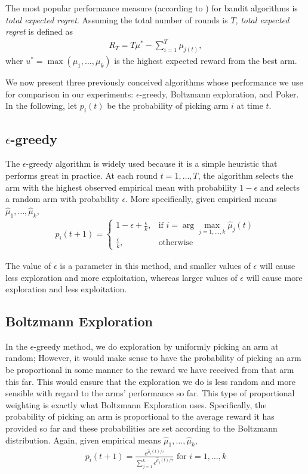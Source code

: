 \documentclass[12pt]{article}
\begin{document}
The most popular performance measure (according to \cite{Kuleshov}) for bandit algorithms is \emph{total expected regret}.  Assuming the 
total number of rounds is $T$, \emph{total expected regret} is defined as
\begin{align}
R_T = T\mu^{*} - \sum_{i=1}^{T} \mu_{j(t)},
\end{align}
wher $u^{*} = \max(\mu_1, \ldots, \mu_k)$ is the highest expected reward from the best arm. 

We now present three previously conceived algorithms whose performance we use for comparison in our experiments:  $\epsilon$-greedy, Boltzmann exploration, and Poker.
In the following, let $p_i(t)$ be the probability of picking arm $i$ at time $t$.

\subsection{$\epsilon$-greedy}
The $\epsilon$-greedy algorithm is widely used because it is a simple heuristic that performs great in practice. 
At each round $t = 1, \ldots, T$, the algorithm selects the arm with the highest observed empirical mean with probability $1 - \epsilon$ and
selects a random arm with probability $\epsilon$.  More specifically, given empirical means $\hat{\mu}_1, \ldots, \hat{\mu}_k$,
\begin{align*}
p_i(t+1) = 
\begin{cases}
1 - \epsilon + \frac{\epsilon}{k}, & \textrm{if } i = \arg \max_{j = 1, \ldots, k} \hat{\mu}_j(t) \\
\frac{\epsilon}{k}, & \textrm{otherwise}
\end{cases}
\end{align*}

The value of $\epsilon$ is a parameter in this method, and smaller values of $\epsilon$ will cause less exploration and more exploitation, whereas
larger values of $\epsilon$ will cause more exploration and less exploitation.

\subsection{Boltzmann Exploration}
In the $\epsilon$-greedy method, we do exploration by uniformly picking an arm at random; However, it would make sense to have the probability 
of picking an arm be proportional in some manner to the reward we have received from that arm this far.  This would ensure that the exploration we do 
is less random and more sensible with regard to the arms' performance so far.  This type of proportional weighting is exactly what Boltzmann Exploration 
uses.  Specifically, the probability of picking an arm is proportional to the average reward it has provided so far and these probabilities are 
set according to the Boltzmann distribution.  Again, given empirical means $\hat{\mu}_1, \ldots, \hat{\mu}_k$,
\begin{align*}
p_i(t+1) = \frac{e^{\hat{\mu}_i(t)/\tau}}{\sum_{j=1}^{k} e^{\hat{\mu}_j(t)/\tau}} \, \, \textrm{for } i = 1, \ldots, k
\end{align*}
\end{document}
